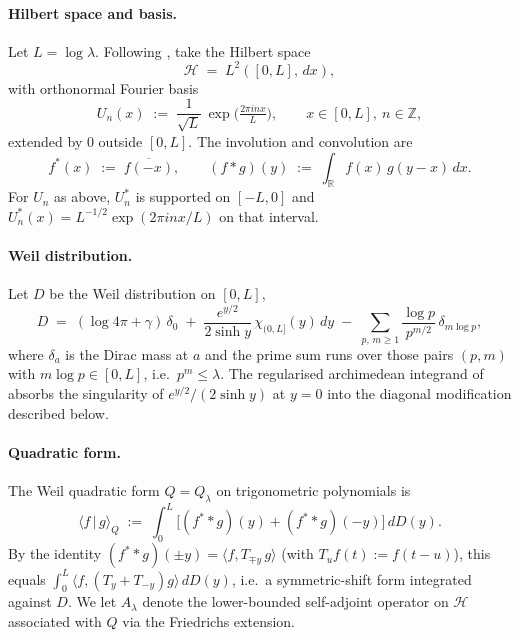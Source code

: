 \documentclass[11pt,a4paper]{article}
\theoremstyle{remark}
\theoremstyle{plain}
\begin{document}
\paragraph{Hilbert space and basis.}  Let $L=\log\lambda$.  Following
\cite[Section~4]{ConnesvS2025}, take the Hilbert space
\[
  \mathcal{H} \;=\; L^2([0,L],\,dx),
\]
with orthonormal Fourier basis
\[
  U_n(x) \;:=\; \frac{1}{\sqrt L}\,\exp\!\Big(\tfrac{2\pi i n x}{L}\Big),
  \qquad x\in[0,L],\ n\in\mathbb{Z},
\]
extended by $0$ outside $[0,L]$.  The involution and convolution are
\[
  f^*(x) \;:=\; \overline{f(-x)},
  \qquad
  (f * g)(y) \;:=\; \int_{\mathbb{R}} f(x)\,g(y-x)\,dx.
\]
For $U_n$ as above, $U_n^*$ is supported on $[-L,0]$ and
$U_n^*(x)=L^{-1/2}\exp(2\pi i n x/L)$ on that interval.

\paragraph{Weil distribution.}  Let $D$ be the Weil distribution on
$[0,L]$,
\begin{equation}
\label{eq:weil-distribution}
  D \;=\; (\log 4\pi + \gamma)\,\delta_0
     \;+\; \frac{e^{y/2}}{2\sinh y}\,\chi_{(0,L]}(y)\,dy
     \;-\; \sum_{p,\,m\geq 1}
           \frac{\log p}{p^{m/2}}\,\delta_{m\log p},
\end{equation}
where $\delta_a$ is the Dirac mass at $a$ and the prime sum runs over
those pairs $(p,m)$ with $m\log p\in[0,L]$, i.e.\ $p^m\le\lambda$.  The
regularised archimedean integrand of \cite[Section~4]{ConnesvS2025}
absorbs the singularity of $e^{y/2}/(2\sinh y)$ at $y=0$ into the
diagonal modification described below.

\paragraph{Quadratic form.}  The Weil quadratic form $Q=Q_\lambda$ on
trigonometric polynomials is
\begin{equation}
\label{eq:quad-form-connesvs}
  \langle f \,|\, g\rangle_Q
  \;:=\; \int_0^L \bigl[(f^* * g)(y) + (f^* * g)(-y)\bigr]\,dD(y).
\end{equation}
By the identity
$(f^**g)(\pm y) = \langle f, T_{\mp y}\,g\rangle$
(with $T_u f(t):=f(t-u)$), this equals
$\int_0^L \langle f, (T_y + T_{-y})g\rangle\,dD(y)$, i.e.\ a
symmetric-shift form integrated against $D$.  We let $A_\lambda$ denote
the lower-bounded self-adjoint operator on $\mathcal{H}$ associated
with $Q$ via the Friedrichs extension.
\end{document}
